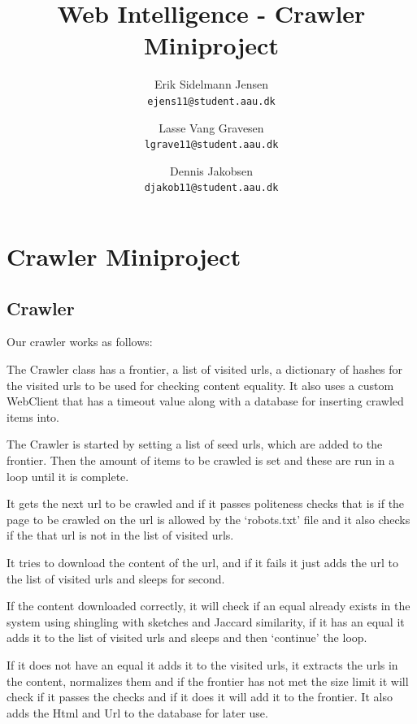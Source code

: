 

\author{
  Erik Sidelmann Jensen\\
  \texttt{ejens11@student.aau.dk}
  \and
  Lasse Vang Gravesen\\
  \texttt{lgrave11@student.aau.dk}
  \and
  Dennis Jakobsen\\
  \texttt{djakob11@student.aau.dk}  
}

\title{Web Intelligence - Crawler Miniproject}
\date{}


	\clearpage\maketitle
	\thispagestyle{empty}
	
	\chapter{Crawler Miniproject}
	\section{Crawler}
	Our crawler works as follows:
	
	The Crawler class has a frontier, a list of visited urls, a dictionary of hashes for the visited urls to be used for checking content equality. It also uses a custom WebClient that has a timeout value along with a database for inserting crawled items into.
	
	The Crawler is started by setting a list of seed urls, which are added to the frontier. Then the amount of items to be crawled is set and these are run in a loop until it is complete.
	
	It gets the next url to be crawled and if it passes politeness checks that is if the page to be crawled on the url is allowed by the `robots.txt' file and it also checks if the that url is not in the list of visited urls.
	
	It tries to download the content of the url, and if it fails it just adds the url to the list of visited urls and sleeps for second.
	
	If the content downloaded correctly, it will check if an equal already exists in the system using shingling with sketches and Jaccard similarity, if it has an equal it adds it to the list of visited urls and sleeps and then `continue' the loop.
	
	If it does not have an equal it adds it to the visited urls, it extracts the urls in the content, normalizes them and if the frontier has not met the size limit it will check if it passes the checks and if it does it will add it to the frontier. It also adds the Html and Url to the database for later use. 
	
